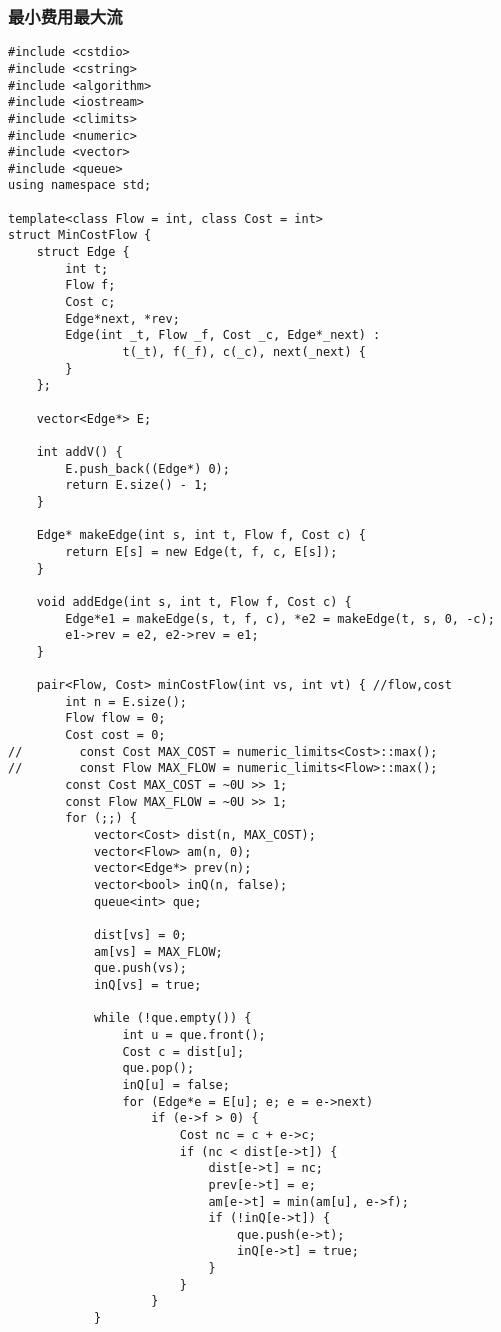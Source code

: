 \subsubsection{最小费用最大流}
\begin{verbatim}
#include <cstdio>
#include <cstring>
#include <algorithm>
#include <iostream>
#include <climits>
#include <numeric>
#include <vector>
#include <queue>
using namespace std;

template<class Flow = int, class Cost = int>
struct MinCostFlow {
    struct Edge {
        int t;
        Flow f;
        Cost c;
        Edge*next, *rev;
        Edge(int _t, Flow _f, Cost _c, Edge*_next) :
                t(_t), f(_f), c(_c), next(_next) {
        }
    };

    vector<Edge*> E;

    int addV() {
        E.push_back((Edge*) 0);
        return E.size() - 1;
    }

    Edge* makeEdge(int s, int t, Flow f, Cost c) {
        return E[s] = new Edge(t, f, c, E[s]);
    }

    void addEdge(int s, int t, Flow f, Cost c) {
        Edge*e1 = makeEdge(s, t, f, c), *e2 = makeEdge(t, s, 0, -c);
        e1->rev = e2, e2->rev = e1;
    }

    pair<Flow, Cost> minCostFlow(int vs, int vt) { //flow,cost
        int n = E.size();
        Flow flow = 0;
        Cost cost = 0;
//        const Cost MAX_COST = numeric_limits<Cost>::max();
//        const Flow MAX_FLOW = numeric_limits<Flow>::max();
        const Cost MAX_COST = ~0U >> 1;
        const Flow MAX_FLOW = ~0U >> 1;
        for (;;) {
            vector<Cost> dist(n, MAX_COST);
            vector<Flow> am(n, 0);
            vector<Edge*> prev(n);
            vector<bool> inQ(n, false);
            queue<int> que;

            dist[vs] = 0;
            am[vs] = MAX_FLOW;
            que.push(vs);
            inQ[vs] = true;

            while (!que.empty()) {
                int u = que.front();
                Cost c = dist[u];
                que.pop();
                inQ[u] = false;
                for (Edge*e = E[u]; e; e = e->next)
                    if (e->f > 0) {
                        Cost nc = c + e->c;
                        if (nc < dist[e->t]) {
                            dist[e->t] = nc;
                            prev[e->t] = e;
                            am[e->t] = min(am[u], e->f);
                            if (!inQ[e->t]) {
                                que.push(e->t);
                                inQ[e->t] = true;
                            }
                        }
                    }
            }


\end{verbatim}
